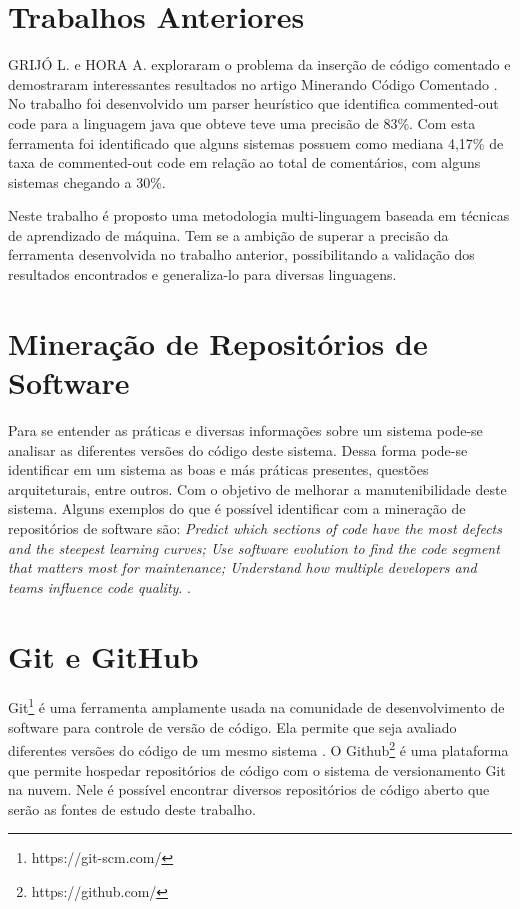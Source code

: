 \documentclass{abnt}
\begin{document}
\section{Trabalhos Anteriores}

GRIJÓ L. e HORA A. exploraram o problema da inserção de código comentado 
e demostraram interessantes resultados no artigo Minerando Código Comentado 
\cite{articleMiningComments}. No trabalho foi desenvolvido um parser heurístico
que identifica commented-out code para a linguagem java que obteve
teve uma precisão de 83\%. Com esta ferramenta foi identificado que alguns 
sistemas possuem como mediana 4,17\% de taxa de commented-out code em relação
ao total de comentários, com alguns sistemas chegando a 30\%.

Neste trabalho é proposto uma metodologia multi-linguagem baseada em técnicas de
aprendizado de máquina. Tem se a ambição de superar a precisão da ferramenta
desenvolvida no trabalho anterior, possibilitando a validação dos resultados 
encontrados e generaliza-lo para diversas linguagens.


\section{Mineração de Repositórios de Software}

Para se entender as práticas e diversas informações sobre um sistema pode-se
analisar as diferentes versões do código deste sistema. Dessa forma pode-se 
identificar em um sistema as boas e más práticas presentes, questões arquiteturais,
entre outros. Com o objetivo de melhorar a manutenibilidade deste sistema.
Alguns exemplos do que é possível identificar com a mineração de repositórios de 
software são: \textit{Predict which sections of code have the most defects and the 
steepest learning curves; Use software evolution to find the code segment that 
matters most for maintenance; Understand how multiple developers and teams 
influence code quality}. \cite{crimeScene}. 


\section{Git e GitHub}

Git\footnote{https://git-scm.com/} é uma ferramenta amplamente usada na comunidade de desenvolvimento de 
software para controle de versão de código. Ela permite que seja avaliado
diferentes versões do código de um mesmo sistema \cite{crimeScene}. 
O Github\footnote{https://github.com/} é uma plataforma
que permite hospedar repositórios de código com o sistema de versionamento
Git na nuvem. Nele é possível encontrar diversos repositórios de código aberto 
que serão as fontes de estudo deste trabalho. 
\end{document}
